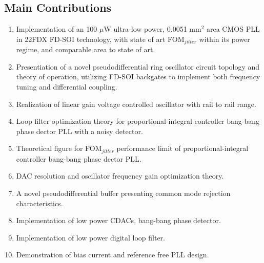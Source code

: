 %

\vspace{1em}

\subsection{Main Contributions}
\vspace{-0.8em}
\begin{enumerate}[itemsep=0pt,label=\protect\mycirc{\arabic*}]
	\setlength\itemsep{-0.8em}
	\item Implementation of an 100 $\mu$W ultra-low power, 0.0051 mm$^2$ area CMOS PLL in 22FDX FD-SOI technology, with state of art FOM$_{jitter}$ within its power regime, and comparable area to state of art.
	\item Presentiation of a novel pseudodifferential ring oscillator circuit topology and theory of operation, utilizing FD-SOI backgates to implement both frequency tuning and differential coupling.
	\item Realization of linear gain voltage controlled oscillator with rail to rail range. 
	\item Loop filter optimization theory for proportional-integral controller bang-bang phase dector PLL with a noisy detector.
	\item Theoretical figure for FOM$_{jitter}$ performance limit of proportional-integral controller bang-bang phase dector PLL.
	\item DAC resolution and oscillator frequency gain optimization theory.
	\item A novel pseudodifferential buffer presenting common mode rejection characteristics.
	\item Implementation of low power CDACs, bang-bang phase detector.
	\item Implementation of low power digital loop filter.
	\item Demonstration of bias current and reference free PLL design.
\end{enumerate}
